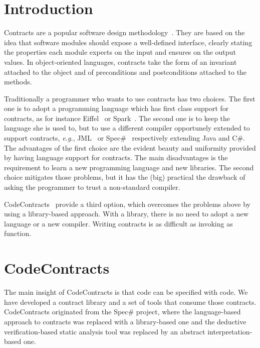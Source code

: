 \documentclass{sig-alternate-2013}
\begin{document}


\section{Introduction}
Contracts are a popular software design methodology~\cite{eiffel}.
They are based on the idea that software modules should expose a well-defined interface, clearly stating the properties each module expects on the input and ensures on the output values.
In object-oriented languages, contracts take the form of an invariant attached to the object and of preconditions and postconditions attached to the methods.

Traditionally a programmer who wants to use contracts has two choices.
The first one is to adopt a programming language which has  first class support for contracts, as for instance Eiffel~\cite{eiffel} or Spark~\cite{spark03}.
The second one is to keep the language she is used to, but to use a different compiler opportunely extended to support contracts, \emph{e.g.}, JML~\cite{jml} or Spec\#~\cite{SpecSharp} respectively extending Java and C\#.
The advantages of the first choice are the evident beauty and uniformity provided by having language support for contracts.
The main disadvantages is the requirement to learn a new programming language and new libraries.
The second choice mitigates those problems, but it has the (big) practical the drawback of asking the programmer to trust a non-standard compiler.

CodeContracts~\cite{BarnettFahndrichLogozzo-SAC10} provide a third option, which overcomes the problems above by using a library-based approach.
With a library, there is no need to adopt a new language or  a new compiler.
Writing contracts is as difficult as invoking as function.

\section{CodeContracts}
The main insight of CodeContracts is that code can be specified with code.
We have developed a contract library and a set of tools that consume those contracts.
CodeContracts originated from the Spec\# project, where the language-based approach to contracts was replaced with a library-based one and the deductive verification-based static analysis tool was replaced by an abstract interpretation-based one.
\end{document}
